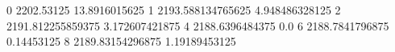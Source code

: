 0 2202.53125 13.8916015625
1 2193.588134765625 4.948486328125
2 2191.812255859375 3.172607421875
4 2188.6396484375 0.0
6 2188.7841796875 0.14453125
8 2189.83154296875 1.19189453125
